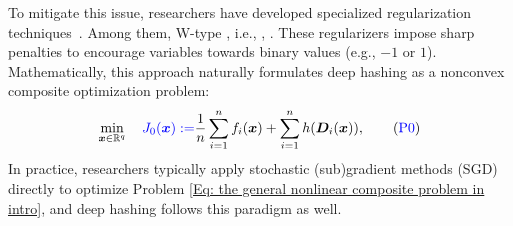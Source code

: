 To mitigate this issue, researchers have developed specialized regularization techniques~\cite{caoDeepCauchyHashing2018,li2017deep,liuDeepSupervisedHashing}. Among them, W-type , i.e., , .
These regularizers impose sharp penalties to encourage variables towards binary values (e.g., $-1$ or $1$). Mathematically, this approach naturally formulates deep hashing as a nonconvex composite optimization problem:
\begin{align}
\label{Eq: the general nonlinear composite problem in intro}
\min_{\bx \in \RR^{q}} \quad \blue{J_0(\bx):=}\frac{1}{n} \sumn f_i (\bx) + \sumn h(\bD_i(\bx)),
\tag{\blue{P0}}
\end{align} In practice, researchers typically apply stochastic (sub)gradient methods (SGD) directly to optimize Problem \eqref{Eq: the general nonlinear composite problem in intro}, and deep hashing follows this paradigm as well. 

